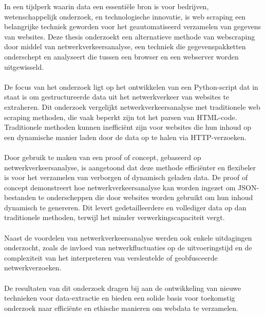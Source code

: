 In een tijdperk waarin data een essentiële bron is voor bedrijven, wetenschappelijk onderzoek, en technologische innovatie, is web scraping een belangrijke techniek geworden voor het geautomatiseerd verzamelen van gegevens van websites. Deze thesis onderzoekt een alternatieve methode van webscraping door middel van netwerkverkeersanalyse, een techniek die gegevenspakketten onderschept en analyseert die tussen een browser en een webserver worden uitgewisseld.
\\ \\
De focus van het onderzoek ligt op het ontwikkelen van een Python-script dat in staat is om gestructureerde data uit het netwerkverkeer van websites te extraheren. Dit onderzoek vergelijkt netwerkverkeersanalyse met traditionele web scraping methoden, die vaak beperkt zijn tot het parsen van HTML-code. Traditionele methoden kunnen inefficiënt zijn voor websites die hun inhoud op een dynamische manier laden door de data op te halen via HTTP-verzoeken.
\\ \\
Door gebruik te maken van een proof of concept, gebaseerd op netwerkverkeersanalyse, is aangetoond dat deze methode efficiënter en flexibeler is voor het verzamelen van verborgen of dynamisch geladen data. De proof of concept demonstreert hoe netwerkverkeersanalyse kan worden ingezet om JSON-bestanden te onderscheppen die door websites worden gebruikt om hun inhoud dynamisch te genereren. Dit levert gedetailleerdere en vollediger data op dan traditionele methoden, terwijl het minder verwerkingscapaciteit vergt.
\\ \\
Naast de voordelen van netwerkverkeersanalyse werden ook enkele uitdagingen onderzocht, zoals de invloed van netwerkfluctuaties op de uitvoeringstijd en de complexiteit van het interpreteren van versleutelde of geobfusceerde netwerkverzoeken.
\\ \\
De resultaten van dit onderzoek dragen bij aan de ontwikkeling van nieuwe technieken voor data-extractie en bieden een solide basis voor toekomstig onderzoek naar efficiënte en ethische manieren om webdata te verzamelen.



